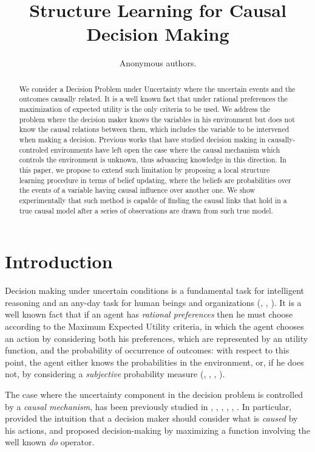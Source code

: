 \documentclass[letterpaper]{article}
\title{Structure Learning for Causal Decision Making}
\author{Anonymous authors.} %
\begin{document}
\maketitle

\begin{abstract}
We consider a Decision Problem under Uncertainty where the uncertain events and the outcomes causally related. It is a well known fact that under rational preferences the maximization of expected utility is the only criteria to be used. We address the problem where the decision maker knows the variables in his environment but does not know the causal relations between them, which includes the variable to be intervened when making a decision. Previous works that have studied decision making in causally-controled environments have left open the case where the causal mechanism which controls the environment is unknown, thus advancing knowledge in this direction. In this paper, we propose to extend such limitation by proposing a local structure learning procedure in terms of belief updating, where the beliefs are probabilities over the events of a variable having causal influence over another one.  We show experimentally that such method is capable of finding the causal links that hold in a true causal model after a series of observations are drawn from such true model. 
\end{abstract}

\section{Introduction}
Decision making under uncertain conditions is a fundamental task for intelligent reasoning and an any-day task for human beings and organizations (\cite{savage1954the}, \cite{danks2014unifying}, \cite{lake2017building}). It is a well known fact that if an agent has \textit{rational preferences} then he must choose according to the Maximum Expected Utility criteria, in which the agent chooses an action by considering both his preferences, which are represented by an utility function, and the probability of occurrence of outcomes: with respect to this point, the agent either knows the probabilities in the environment, or, if he does not, by considering a \textit{subjective} probability measure (\cite{von1944theory}, \cite{savage1954the}, \cite{bernardo2000bayesian}, \cite{gilboa2009decision}). 

The case where the uncertainty component in the decision problem is controlled by a \textit{causal mechanism}, has been previously studied in \cite{joyce1999foundations}, \cite{pearl2009causality}, \cite{lattimoreNIPS2016}, \cite{sen2017identifying}, \cite{gonzalez2018playing}, \cite{2019arXiv190202279G}. In particular, \cite{joyce1999foundations} provided the intuition that a decision maker should consider what is \textit{caused} by his actions, and \cite{pearl2009causality} proposed decision-making by maximizing a function involving the well known \textit{do} operator.
\end{document}

